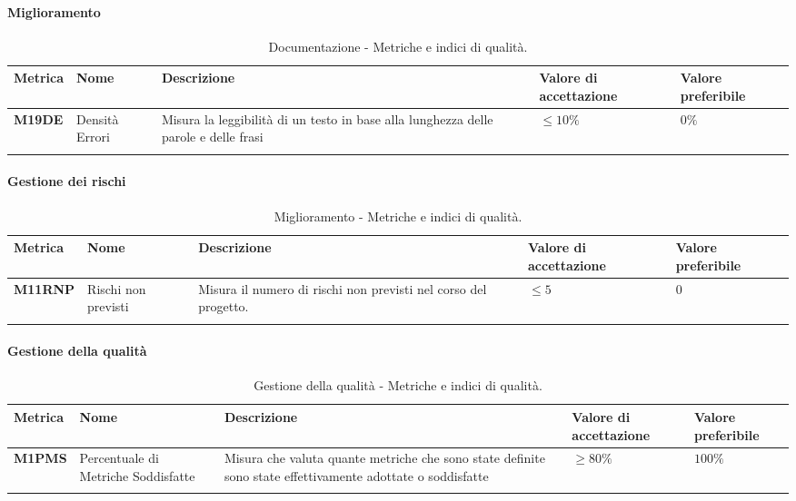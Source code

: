 \paragraph{Miglioramento}
\hspace{1pt}
    \begin{longtable}{|C{1.5cm}|L{3cm}|L{4cm}|L{2.5cm}|L{2.5cm}|}
        \hline
        \textbf{Metrica} & \textbf{Nome} & \textbf{Descrizione} & \textbf{Valore di accettazione} & \textbf{Valore preferibile} \\
        \hline
        \textbf{M19DE} & Densità Errori & Misura la leggibilità di un testo in base alla lunghezza delle parole e delle frasi & $\leq 10\%$ & $ 0\%$ \\
        \hline
    \caption{Documentazione - Metriche e indici di qualità.}
    \label{tab:metriche_miglioramento}
\end{longtable}


\paragraph{Gestione dei rischi}
\hspace{1pt}
    \begin{longtable}{|C{1.5cm}|L{3cm}|L{4cm}|L{2.5cm}|L{2.5cm}|}
        \hline
      \textbf{Metrica} & \textbf{Nome} & \textbf{Descrizione} & \textbf{Valore di accettazione} & \textbf{Valore preferibile} \\
      \hline
      \textbf{M11RNP}    & Rischi non previsti   & Misura il numero di rischi non previsti nel corso del progetto. & $\leq 5$ &   $0$ \\
      \hline
    \caption{Miglioramento - Metriche e indici di qualità.}
    \label{tab:tabella2}
\end{longtable}


\paragraph{Gestione della qualità}
\hspace{1pt}
    \begin{longtable}{|C{1.5cm}|L{3cm}|L{4cm}|L{2.5cm}|L{2.5cm}|}
        \hline
        \textbf{Metrica} & \textbf{Nome} & \textbf{Descrizione} & \textbf{Valore di accettazione} & \textbf{Valore preferibile} \\
        \hline
        \textbf{M1PMS} & Percentuale di Metriche Soddisfatte & Misura che valuta quante metriche che sono state definite sono state effettivamente adottate o soddisfatte & $\geq 80\%$ & $100\%$ \\
        \hline
    \caption{Gestione della qualità - Metriche e indici di qualità.}
    \label{tab:gestione_metriche_testo}
\end{longtable}



